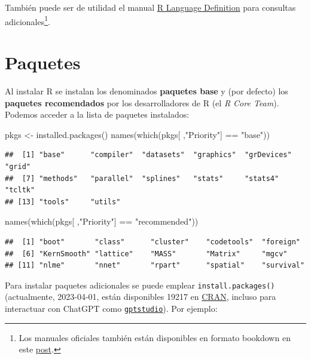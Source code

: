 \documentclass[
]{book}
\newenvironment{Shaded}{\begin{snugshade}}{\end{snugshade}}
\newcommand{\FunctionTok}[1]{\textcolor[rgb]{0.00,0.00,0.00}{#1}}
\newcommand{\NormalTok}[1]{#1}
\newcommand{\OtherTok}[1]{\textcolor[rgb]{0.56,0.35,0.01}{#1}}
\newcommand{\SpecialCharTok}[1]{\textcolor[rgb]{0.00,0.00,0.00}{#1}}
\newcommand{\StringTok}[1]{\textcolor[rgb]{0.31,0.60,0.02}{#1}}
\theoremstyle{break}
\theoremstyle{nonumberplain}
\begin{document}
También puede ser de utilidad el manual \href{https://cran.r-project.org/doc/manuals/R-lang.html}{R Language Definition}
para consultas adicionales\footnote{Los manuales oficiales también están disponibles en formato bookdown en este \href{https://colinfay.me/r-manuals}{post}.}.

\hypertarget{paquetes}{%
\section{Paquetes}\label{paquetes}}

Al instalar R se instalan los denominados \textbf{paquetes base} y (por defecto) los \textbf{paquetes recomendados} por los desarrolladores de R (el \emph{R Core Team}).
Podemos acceder a la lista de paquetes instalados:

\begin{Shaded}
\begin{Highlighting}[]
\NormalTok{pkgs }\OtherTok{\textless{}{-}} \FunctionTok{installed.packages}\NormalTok{()}
\FunctionTok{names}\NormalTok{(}\FunctionTok{which}\NormalTok{(pkgs[ ,}\StringTok{"Priority"}\NormalTok{] }\SpecialCharTok{==} \StringTok{"base"}\NormalTok{))}
\end{Highlighting}
\end{Shaded}

\begin{verbatim}
##  [1] "base"      "compiler"  "datasets"  "graphics"  "grDevices" "grid"     
##  [7] "methods"   "parallel"  "splines"   "stats"     "stats4"    "tcltk"    
## [13] "tools"     "utils"
\end{verbatim}

\begin{Shaded}
\begin{Highlighting}[]
\FunctionTok{names}\NormalTok{(}\FunctionTok{which}\NormalTok{(pkgs[ ,}\StringTok{"Priority"}\NormalTok{] }\SpecialCharTok{==} \StringTok{"recommended"}\NormalTok{))}
\end{Highlighting}
\end{Shaded}

\begin{verbatim}
##  [1] "boot"       "class"      "cluster"    "codetools"  "foreign"   
##  [6] "KernSmooth" "lattice"    "MASS"       "Matrix"     "mgcv"      
## [11] "nlme"       "nnet"       "rpart"      "spatial"    "survival"
\end{verbatim}

Para instalar paquetes adicionales se puede emplear \texttt{install.packages()} (actualmente, 2023-04-01, están disponibles 19217 en \href{https://cran.r-project.org/web/packages/available_packages_by_date.html}{CRAN}, incluso para interactuar con ChatGPT como \href{https://michelnivard.github.io/gptstudio}{\texttt{gptstudio}}).
Por ejemplo:
\end{document}
